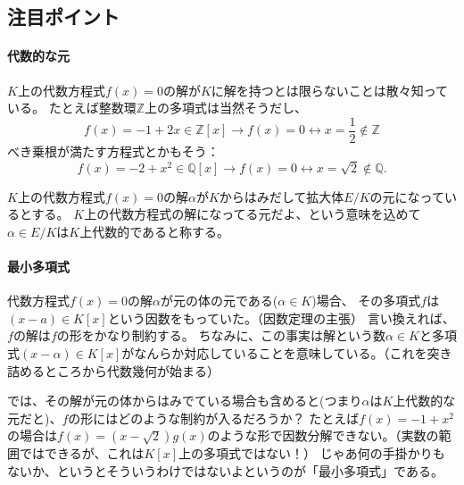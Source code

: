 \documentclass[uplatex]{jsarticle}
\begin{document}
\subsection{注目ポイント}

\paragraph*{代数的な元}
$K$上の代数方程式$f(x) = 0$の解が$K$に解を持つとは限らないことは散々知っている。
たとえば整数環$\mathbb{Z}$上の多項式は当然そうだし、
\begin{equation}
    f(x) = -1 + 2x \in \mathbb{Z}[x] \rightarrow f(x)=0 \leftrightarrow x = \frac{1}{2} \notin \mathbb{Z}
\end{equation}
べき乗根が満たす方程式とかもそう：
\begin{equation}
    f(x) = -2 + x^2 \in \mathbb{Q}[x] \rightarrow f(x) =0 \leftrightarrow x = \sqrt{2} \notin \mathbb{Q}.
\end{equation}

$K$上の代数方程式$f(x)=0$の解$\alpha$が$K$からはみだして拡大体$E/K$の元になっているとする。
$K$上の代数方程式の解になってる元だよ、という意味を込めて$\alpha \in E/K$は$K$上代数的であると称する。

\paragraph*{最小多項式}
代数方程式$f(x)= 0$の解$\alpha$が元の体の元である($\alpha \in K$)場合、
その多項式$f$は$(x-a) \in K[x]$という因数をもっていた。（因数定理の主張）
言い換えれば、$f$の解は$f$の形をかなり制約する。
ちなみに、この事実は解という数$\alpha \in K$と多項式$(x-\alpha) \in K[x]$がなんらか対応していることを意味している。（これを突き詰めるところから代数幾何が始まる）

では、その解が元の体からはみでている場合も含めると(つまり$\alpha$は$K$上代数的な元だと)、$f$の形にはどのような制約が入るだろうか？
たとえば$f(x) = -1 + x^2$の場合は$f(x) = (x - \sqrt{2})g(x)$のような形で因数分解できない。（実数の範囲ではできるが、これは$K[x]$上の多項式ではない！）
じゃあ何の手掛かりもないか、というとそういうわけではないよというのが「最小多項式」である。
\end{document}
